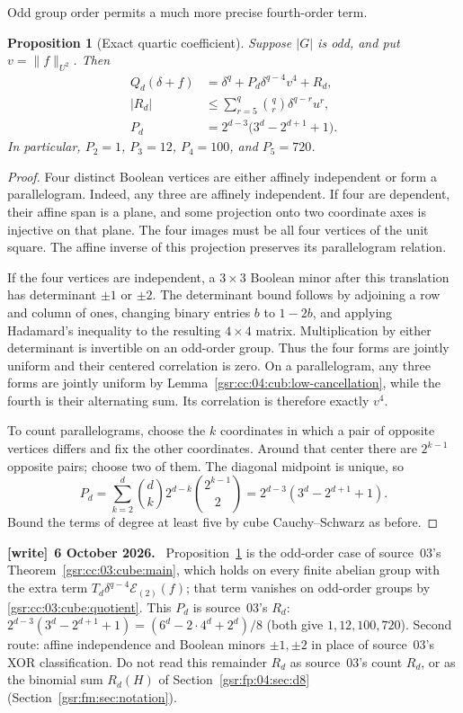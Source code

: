 \documentclass[11pt,letterpaper]{article}
\numberwithin{equation}{section}
\newtheorem{proposition}[theorem]{Proposition}
\theoremstyle{definition}
\theoremstyle{remark}
\newcommand{\1}{\mathbf 1}
\newenvironment{writenote}[1][]{\par\smallskip\begingroup\small
 \noindent\textbf{[write]}\if\relax\detokenize{#1}\relax\else~\textbf{#1.}\fi\ }%
 {\par\endgroup\smallskip}
\begin{document}
Odd group order permits a much more precise fourth-order term.

\begin{proposition}[Exact quartic coefficient]
\label{gsr:cc:04:cub:quartic}
Suppose $|G|$ is odd, and put $v=\|f\|_{U^2}$. Then
\begin{align}
 Q_d(\delta+f)
   &=\delta^q+P_d\delta^{q-4}v^4+R_d,\\
 |R_d|&\leq\sum_{r=5}^{q}\binom qr\delta^{q-r}u^r,
 \label{gsr:cc:04:cub:quartic-expansion}\\
 P_d&=2^{d-3}\bigl(3^d-2^{d+1}+1\bigr).
 \label{gsr:cc:04:cub:parallelogram-number}
\end{align}
In particular, $P_2=1$, $P_3=12$, $P_4=100$, and $P_5=720$.
\end{proposition}

\begin{proof}
Four distinct Boolean vertices are either affinely independent or form a
parallelogram. Indeed, any three are affinely independent. If four are
dependent, their affine span is a plane, and some projection onto two
coordinate axes is injective on that plane. The four images must be all
four vertices of the unit square. The affine inverse of this projection
preserves its parallelogram relation.

If the four vertices are independent, a $3\times3$ Boolean minor after this
translation has determinant $\pm1$ or $\pm2$. The determinant bound follows
by adjoining a row and column of ones, changing binary entries $b$ to
$1-2b$, and applying Hadamard's inequality to the resulting $4\times4$
matrix. Multiplication by either determinant is invertible on an odd-order
group. Thus the four forms are jointly uniform and their centered
correlation is zero. On a parallelogram, any three forms are jointly uniform
by Lemma~\ref{gsr:cc:04:cub:low-cancellation}, while the fourth is their alternating
sum. Its correlation is therefore exactly $v^4$.

To count parallelograms, choose the $k$ coordinates in which a pair of
opposite vertices differs and fix the other coordinates. Around that center
there are $2^{k-1}$ opposite pairs; choose two of them. The diagonal midpoint
is unique, so
\[
 P_d=\sum_{k=2}^d\binom dk2^{d-k}\binom{2^{k-1}}2
     =2^{d-3}(3^d-2^{d+1}+1).
\]
Bound the terms of degree at least five by cube Cauchy--Schwarz as before.
\end{proof}
\begin{writenote}[6 October 2026]
Proposition~\ref{gsr:cc:04:cub:quartic} is the odd-order case of source~03's Theorem~\ref{gsr:cc:03:cube:main}, which holds on every finite abelian group with the extra term $T_d\delta^{q-4}\mathcal E_{(2)}(f)$; that term vanishes on odd-order groups by \eqref{gsr:cc:03:cube:quotient}. This $P_d$ is source~03's $R_d$: $2^{d-3}(3^d-2^{d+1}+1)=(6^d-2\cdot4^d+2^d)/8$ (both give $1,12,100,720$). Second route: affine independence and Boolean minors $\pm1,\pm2$ in place of source~03's XOR classification. Do not read this remainder $R_d$ as source~03's count $R_d$, or as the binomial sum $R_d(H)$ of Section~\ref{gsr:fp:04:sec:d8} (Section~\ref{gsr:fm:sec:notation}).
\end{writenote}
\end{document}

